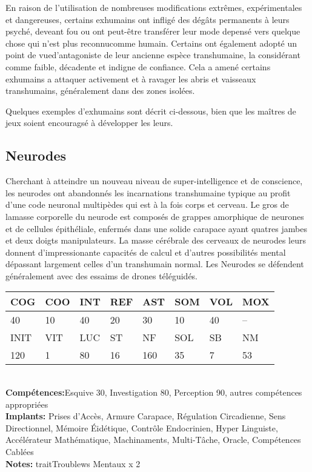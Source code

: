 En raison de l'utilisation de nombreuses modifications extrêmes, expérimentales et dangereuses, certains exhumains ont infligé des dégâts permanents à leurs psyché, deveant fou ou ont peut-être transférer leur mode depensé vers quelque chose qui n'est plus reconnucomme humain. Certains ont également adopté un point de vued'antagoniste de leur ancienne espèce transhumaine, la considérant comme faible, décadente et indigne de confiance. Cela a amené certains exhumains a attaquer activement et à ravager les abris et vaisseaux transhumains, généralement dans des zones isolées. 

Quelques exemples d'exhumains sont décrit ci-dessous, bien que les maîtres de jeux soient encouragsé à développer les leurs. 

\subsection{Neurodes} 

Cherchant à atteindre un nouveau niveau de super-intelligence et de conscience, les neurodes ont abandonnés les incarnations transhumaine typique au profit d'une code neuronal multipèdes qui est à la fois corps et cerveau. Le gros de lamasse corporelle du neurode est composés de grappes amorphique de neurones et de cellules épithéliale, enfermés dans une solide carapace ayant quatres jambes et deux doigts manipulateurs. La masse cérébrale des cerveaux de neurodes leurs donnent d'impressionante capacités de calcul et d'autres possibilités mental dépassant largement celles d'un transhumain normal. Les Neurodes se défendent généralement avec des essaims de drones téléguidés. 

\begin{tabular}{|l|l|l|l|l|l|l|l|} \hline

COG &COO &INT &REF &AST &SOM &VOL &MOX \\ \hline

40 &10 &40 &20 &30 &10 &40 &-- \\ \hline

INIT &VIT &LUC &ST &NF &SOL &SB &NM \\ \hline

120 &1 &80 &16 &160 &35 &7 &53 \\ \hline

\end{tabular} \\ \textbf{Compétences:}Esquive 30, Investigation 80, Perception 90, autres compétences appropriées \\ \textbf{Implants:} Prises d'Accès, Armure Carapace, Régulation Circadienne, Sens Directionnel, Mémoire Éidétique, Contrôle Endocrinien, Hyper Linguiste, Accélérateur Mathématique, Machinaments, Multi-Tâche, Oracle, Compétences Cablées\\ \textbf{Notes:} traitTroublews Mentaux x 2 \\ 

